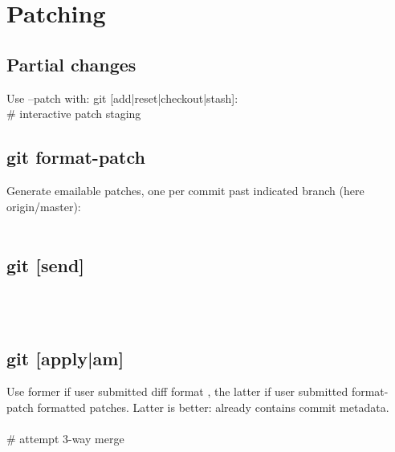 \section{Patching}


\subsection*{Partial changes}
Use --patch with: git [add|reset|checkout|stash]: \\
 \# interactive patch staging

\subsection*{git format-patch}
Generate emailable patches, one per commit 
past indicated branch (here origin/master): \\
\\


\subsection*{git [send]}
\\
\\


\subsection*{git [apply|am]}
Use former if user submitted diff format , the latter if user submitted format-patch formatted patches.  Latter is better: already contains commit metadata.
\\
\\
 \# attempt 3-way merge\\
